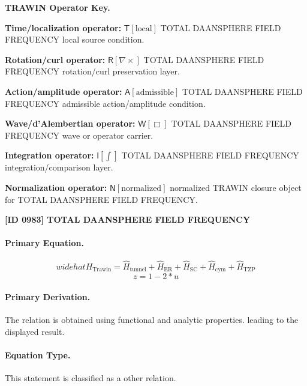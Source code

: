 \par\vspace{0.45\baselineskip}
\noindent\begin{minipage}[t]{\linewidth}
\begingroup
\small
\raggedright
\textbf{TRAWIN Operator Key.}\par
\noindent\textbf{Time/localization operator:} $\mathsf{T}\!\left[\mathrm{local}\right]$ TOTAL DAANSPHERE FIELD FREQUENCY local source condition.\par
\noindent\textbf{Rotation/curl operator:} $\mathsf{R}\!\left[\nabla\times\right]$ TOTAL DAANSPHERE FIELD FREQUENCY rotation/curl preservation layer.\par
\noindent\textbf{Action/amplitude operator:} $\mathsf{A}\!\left[\mathrm{admissible}\right]$ TOTAL DAANSPHERE FIELD FREQUENCY admissible action/amplitude condition.\par
\noindent\textbf{Wave/d'Alembertian operator:} $\mathsf{W}\!\left[\Box\right]$ TOTAL DAANSPHERE FIELD FREQUENCY wave or operator carrier.\par
\noindent\textbf{Integration operator:} $\mathsf{I}\!\left[\int\right]$ TOTAL DAANSPHERE FIELD FREQUENCY integration/comparison layer.\par
\noindent\textbf{Normalization operator:} $\mathsf{N}\!\left[\mathrm{normalized}\right]$ normalized TRAWIN closure object for TOTAL DAANSPHERE FIELD FREQUENCY.\par
\endgroup
\end{minipage}

\clearpage
\noindent\textbf{[ID 0983] TOTAL DAANSPHERE FIELD FREQUENCY}\par
\vspace{0.35em}
\paragraph{Primary Equation.}
\[
widehat{H}_{\mathrm{Trawin}} = \widehat{H}_{\mathrm{tunnel}} + \widehat{H}_{\mathrm{ER}} + \widehat{H}_{\mathrm{SC}} + \widehat{H}_{\mathrm{cym}} + \widehat{H}_{\mathrm{TZP}}
\]
\[
z = 1 - 2*u
\]

\paragraph{Primary Derivation.}
The relation is obtained using functional and analytic properties. leading to the displayed result.
\paragraph{Equation Type.}
This statement is classified as a other relation.

